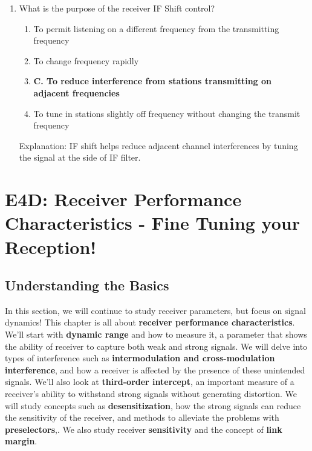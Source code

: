 \begin{enumerate}
      \item What is the purpose of the receiver IF Shift control?
       \begin{enumerate}
        \item  To permit listening on a different frequency from the transmitting frequency
        \item  To change frequency rapidly
      \item \textbf{C. To reduce interference from stations transmitting on adjacent frequencies}
        \item  To tune in stations slightly off frequency without changing the transmit frequency
    \end{enumerate}
         \textcolor{myred}{Explanation:}
         IF shift helps reduce adjacent channel interferences by tuning the signal at the side of IF filter.

\end{enumerate}

\section{E4D: Receiver Performance Characteristics - Fine Tuning your Reception!}
\subsection*{Understanding the Basics}
In this section, we will continue to study receiver parameters, but focus on signal dynamics! This chapter is all about \textcolor{myblue}{\textbf{receiver performance characteristics}}. We'll start with \textcolor{myblue}{\textbf{dynamic range}} and how to measure it, a parameter that shows the ability of receiver to capture both weak and strong signals. We will delve into types of interference such as  \textcolor{myblue}{\textbf{intermodulation and cross-modulation interference}}, and how a receiver is affected by the presence of these unintended signals. We’ll also look at  \textcolor{myblue}{\textbf{third-order intercept}}, an important measure of a receiver's ability to withstand strong signals without generating distortion. We will study concepts such as \textcolor{myblue}{\textbf{desensitization}}, how the strong signals can reduce the sensitivity of the receiver, and methods to alleviate the problems with  \textcolor{myblue}{\textbf{preselectors}},. We also study receiver \textcolor{myblue}{\textbf{sensitivity}} and the concept of \textcolor{myblue}{\textbf{link margin}}.

